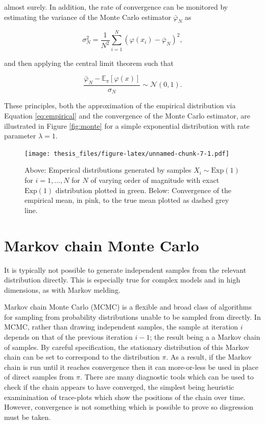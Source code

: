 \documentclass[11pt,]{book}
\begin{document}
almost surely. In addition, the rate of convergence can be monitored by
estimating the variance of the Monte Carlo estimator \(\bar \varphi_N\)
as

\begin{equation}
\sigma^2_N = \frac{1}{N^2} \sum_{i=1}^{N} \left( \varphi(x_i) - \bar \varphi_N \right)^2,
\end{equation}

and then applying the central limit theorem such that

\begin{equation}
\frac{\bar \varphi_N - \mathbb{E}_\pi[\varphi(x)]}{\sigma_N} \sim \mathcal{N}(0, 1).
\end{equation}

These principles, both the approximation of the empirical distribution
via Equation \eqref{eq:empirical} and the convergence of the Monte Carlo
estimator, are illustrated in Figure \eqref{fig:monte} for a simple
exponential distribution with rate parameter \(\lambda = 1\).

\begin{figure}
\centering
\texttt{[image: thesis\_files/figure-latex/unnamed-chunk-7-1.pdf]}
\caption{\label{fig:unnamed-chunk-7}Above: Emperical distributions generated
by samples \(X_i \sim \text{Exp}(1)\) for \(i = 1, \ldots, N\) for \(N\)
of varying order of magnitude with exact \(\text{Exp}(1)\) distribution
plotted in green. Below: Convergence of the empirical mean, in pink, to
the true mean plotted as dashed grey line. \label{fig:monte}}
\end{figure}

\section{Markov chain Monte Carlo}\label{markov-chain-monte-carlo}

It is typically not possible to generate independent samples from the
relevant distribution directly. This is especially true for complex
models and in high dimensions, as with Markov melding.

Markov chain Monte Carlo (MCMC) is a flexible and broad class of
algorithms for sampling from probability distributions unable to be
sampled from directly. In MCMC, rather than drawing independent samples,
the sample at iteration \(i\) depends on that of the previous iteration
\(i-1\); the result being a a Markov chain of samples. By careful
specification, the stationary distribution of this Markov chain can be
set to correspond to the distribution \(\pi\). As a result, if the
Markov chain is run until it reaches convergence then it can
more-or-less be used in place of direct samples from \(\pi\). There are
many diagnostic tools which can be used to check if the chain appears to
have converged, the simplest being heuristic examinination of
trace-plots which show the positions of the chain over time. However,
convergence is not something which is possible to prove so disgression
must be taken.
\end{document}
